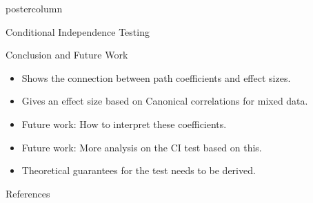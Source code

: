 \documentclass{beamer}
\begin{document}
\begin{frame}
\begin{columns}
\begin{column}{0.33\textwidth}
\begin{beamercolorbox}[center]{postercolumn}
\begin{minipage}{.98\textwidth}
{\begin{myblock}{Conditional Independence Testing}
	\end{myblock}\vfill
	\begin{myblock}{Conclusion and Future Work}
		\begin{itemize}
			\item Shows the connection between path coefficients and effect sizes.
			\item Gives an effect size based on Canonical correlations for mixed data.
			\item Future work: How to interpret these coefficients.
			\item Future work: More analysis on the CI test based on this.
			\item Theoretical guarantees for the test needs to be derived.
		\end{itemize}
	\end{myblock}\vfill
	\begin{myblock}{References}
		\footnotesize
		
		
	\end{myblock}\vfill
		}\end{minipage}\end{beamercolorbox}
	\end{column}
\end{columns}
\end{frame}
\end{document}
